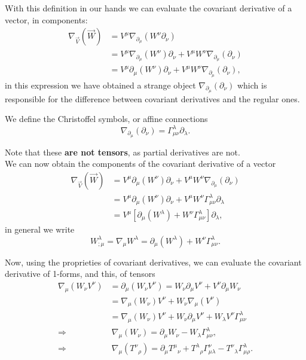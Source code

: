 With this definition in our hands we can evaluate the covariant derivative of a vector, in components:
\begin{align*}
    \nabla_{\vec V}(\vec W)&=V^\mu\nabla_{\partial_\mu}(W^\nu\partial_\nu)\\
    &=V^\mu\nabla_{\partial_\mu}(W^\nu)\partial_\nu+V^\mu W^\nu\nabla_{\partial_\mu}(\partial_\nu)\\
    &=V^\mu\partial_\mu(W^\nu)\partial_\nu+V^\mu W^\nu\nabla_{\partial_\mu}(\partial_\nu),
\end{align*}
in this expression we have obtained a strange object $\nabla_{\partial_\mu}(\partial_\nu)$ which is responsible for the difference between covariant derivatives and the regular ones.
\begin{defin}
    We define the Christoffel symbols, or affine connections $$\nabla_{\partial_\mu}(\partial_\nu)=\Gamma_{\mu\nu}^\lambda\partial_\lambda.$$
\end{defin}
Note that these \textbf{are not tensors}, as partial derivatives are not.\\
We can now obtain the components of the covariant derivative of a vector
\begin{align*}
    \nabla_{\vec V}(\vec W)&=V^\mu\partial_\mu(W^\nu)\partial_\nu+V^\mu W^\nu\nabla_{\partial_\mu}(\partial_\nu)\\&=V^\mu\partial_\mu(W^\nu)\partial_\nu+V^\mu W^\nu \Gamma_{\mu\nu}^\lambda\partial_\lambda\\
    &=V^\mu[\partial_\mu(W^\lambda)+W^\nu \Gamma_{\mu\nu}^\lambda]\partial_\lambda,
\end{align*}
in general we write 
\begin{equation*}
    \boxed{W^\lambda_{;\mu}=\nabla_\mu W^\lambda=\partial_\mu(W^\lambda)+W^\nu \Gamma_{\mu\nu}^\lambda}.
\end{equation*}

Now, using the proprieties of covariant derivatives, we can evaluate the covariant derivative of 1-forms, and this, of tensors
\begin{align*}
    \nabla_\mu(W_\nu V^\nu)&=\partial_\mu(W_\nu V^\nu)=W_\nu \partial_\mu V^\nu+V^\nu \partial_\mu W_\nu
    \\&=\nabla_\mu(W_\nu )V^\nu+W_\nu\nabla_\mu( V^\nu)\\
    &=\nabla_\mu(W_\nu )V^\nu+ W_\nu\partial_\mu V^\nu+W_\lambda V^\nu \Gamma_{\mu\nu}^\lambda\\
    \Rightarrow\ &\ \boxed{\nabla_\mu(W_\nu )=\partial_\mu W_\nu-W_\lambda  \Gamma_{\mu\nu}^\lambda},\\
    \Rightarrow\ &\ \boxed{\nabla_\mu(T^\nu\phantom{}_\rho )=\partial_\mu T^\mu\phantom{}_\nu+T^\lambda\phantom{}_\rho  \Gamma_{\mu\lambda}^\nu-T^\nu\phantom{}_\lambda  \Gamma_{\mu\rho}^\lambda}.
\end{align*}
